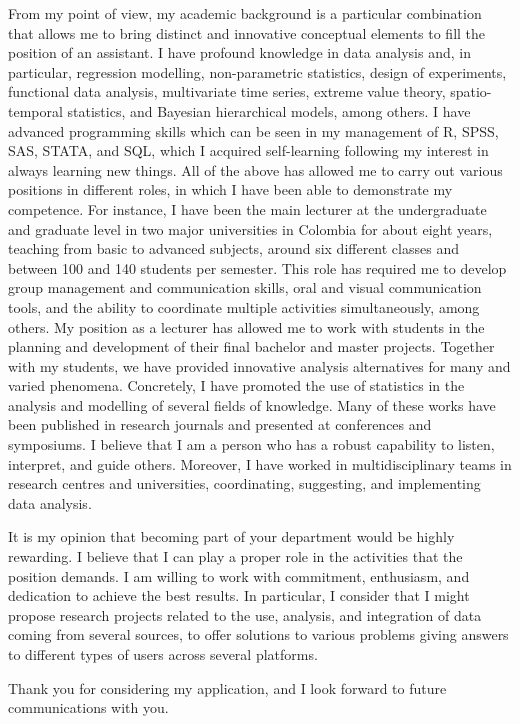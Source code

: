 \documentclass[11pt, a4paper]{awesome-cv}
\begin{document}
\begin{cvletter}
From my point of view, my academic background is a particular combination that allows me to bring distinct and innovative conceptual elements to fill the position of an assistant. I have profound knowledge in data analysis and, in particular, regression modelling, non-parametric statistics, design of experiments,  functional data analysis, multivariate time series, extreme value theory, spatio-temporal statistics, and  Bayesian hierarchical models, among others. I have advanced programming skills which can be seen in my management of R, SPSS, SAS, STATA, and SQL, which I acquired self-learning following my interest in always learning new things. All of the above has allowed me to carry out various positions in different roles, in which I have been able to demonstrate my competence. For instance, I have been the main lecturer at the undergraduate and graduate level in two major universities in Colombia for about eight years, teaching from basic to advanced subjects, around six different classes and between 100 and 140 students per semester. This role has required me to develop group management and communication skills, oral and visual communication tools, and the ability to coordinate multiple activities simultaneously, among others. My position as a lecturer has allowed me to work with students in the planning and development of their final bachelor and master projects. Together with my students, we have provided innovative analysis alternatives for many and varied phenomena. Concretely, I have promoted the use of statistics in the analysis and modelling of several fields of knowledge. Many of these works have been published in research journals and presented at conferences and symposiums. I believe that I am a person who has a robust capability to listen, interpret, and guide others. Moreover, I have worked in multidisciplinary teams in research centres and universities, coordinating, suggesting, and implementing data analysis. \par
It is my opinion that becoming part of your department would be highly rewarding. I believe that I can play a proper role in the activities that the position demands. I am willing to work with commitment, enthusiasm, and dedication to achieve the best results. In particular, I consider that I might propose research projects related to the use, analysis, and integration of data coming from several sources, to offer solutions to various problems giving answers to different types of users across several platforms.\par\bigskip
Thank you for considering my application, and I look forward to future communications with you.
\end{cvletter}


\makeletterclosing
\end{document}
